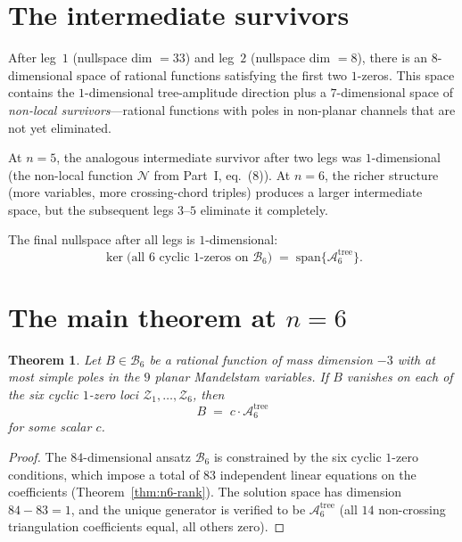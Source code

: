 \documentclass[11pt]{article}
\theoremstyle{plain}
\newtheorem{theorem}{Theorem}[section]
\theoremstyle{definition}
\newcommand{\cA}{\mathcal{A}}
\newcommand{\cB}{\mathcal{B}}
\newcommand{\cZ}{\mathcal{Z}}
\newcommand{\cN}{\mathcal{N}}
\begin{document}
\section{The intermediate survivors}

After leg~$1$ (nullspace dim $= 33$) and leg~$2$ (nullspace dim $= 8$), there is an
$8$-dimensional space of rational functions satisfying the first two $1$-zeros. This
space contains the $1$-dimensional tree-amplitude direction plus a $7$-dimensional
space of \emph{non-local survivors}---rational functions with poles in non-planar
channels that are not yet eliminated.

At $n=5$, the analogous intermediate survivor after two legs was $1$-dimensional
(the non-local function $\cN$ from Part~I, eq.~(8)). At $n=6$, the richer
structure (more variables, more crossing-chord triples) produces a larger
intermediate space, but the subsequent legs $3$--$5$ eliminate it completely.

The final nullspace after all legs is $1$-dimensional:
\begin{equation}
\ker\bigl(\text{all $6$ cyclic $1$-zeros on } \cB_6\bigr)
\;=\; \mathrm{span}\bigl\{\cA_6^{\mathrm{tree}}\bigr\}.
\end{equation}

\section{The main theorem at $n=6$}

\begin{theorem}\label{thm:n6}
Let $B \in \cB_6$ be a rational function of mass dimension $-3$ with at most simple
poles in the $9$ planar Mandelstam variables. If $B$ vanishes on each of the six
cyclic $1$-zero loci $\cZ_1, \ldots, \cZ_6$, then
\[
B \;=\; c \cdot \cA_6^{\mathrm{tree}}
\]
for some scalar $c$.
\end{theorem}

\begin{proof}
The $84$-dimensional ansatz $\cB_6$ is constrained by the six cyclic $1$-zero
conditions, which impose a total of $83$ independent linear equations on the
coefficients (Theorem~\ref{thm:n6-rank}). The solution space has dimension
$84 - 83 = 1$, and the unique generator is verified to be $\cA_6^{\mathrm{tree}}$
(all $14$ non-crossing triangulation coefficients equal, all others zero).
\end{proof}
\end{document}
